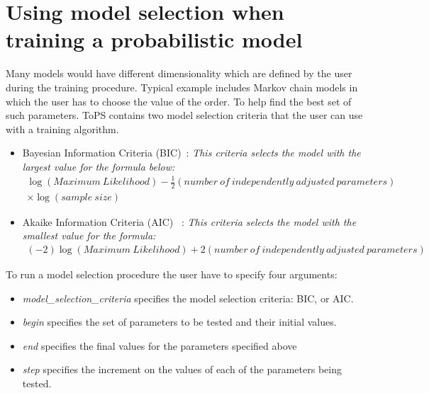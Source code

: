 \section{Using model selection when training a probabilistic model}


Many models would have different dimensionality which are defined by the user during the training procedure. Typical example includes Markov chain models in which the user has to choose the value of the order. To help find the best set of such parameters. ToPS contains two model selection criteria that the user can use with a training algorithm.

\vspace{1em}
\begin{minipage}{\textwidth}
\begin{itemize}
\item  Bayesian Information Criteria (BIC)~\cite{Schwarz1978}: \textit{This criteria selects the model with the largest value for the formula below:}
\begin{align*}
\log (Maximum~Likelihood) - \frac{1}{2} (number~of~independently~adjusted~parameters) \\ \times \log (sample~size)
\end{align*}
\vspace{1em}

\item Akaike Information Criteria (AIC) ~\cite{Akaike1974}: \textit{This criteria selects the model with the smallest value for the formula:}
\begin{align*}
(-2) \log (Maximum~Likelihood) + 2  (number~of~independently~adjusted~parameters)
\end{align*}
\end{itemize}
\end{minipage}
\vspace{1em}

To run a model selection procedure the user have to specify four arguments:

\begin{itemize}
\item \textit{model\_selection\_criteria} specifies the model selection criteria: BIC, or AIC.
\item \textit{begin} specifies the set of parameters to be tested and their initial values.
\item \textit{end} specifies  the final values for the parameters specified above
\item \textit{step} specifies the increment on the values of each of the parameters being tested.
\end{itemize}


